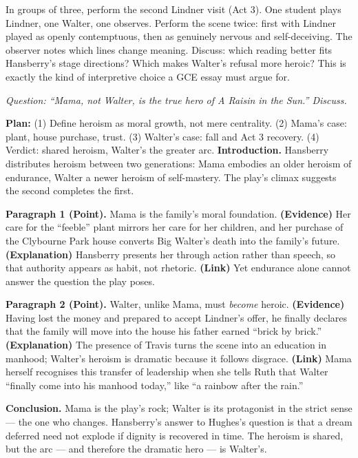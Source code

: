 \documentclass[11pt]{article}
\newcounter{popsec}
\newcounter{popsub}
\newcommand{\courssub}[1]{%
  \stepcounter{popsub}%
  \par\vspace{9pt}\noindent{\popxbold\fontsize{11.5}{13}\selectfont\color{popink}{\color{poporange}\thepopsec.\thepopsub}\hspace{6pt}#1}\par\nopagebreak\vspace{4pt}
}
\begin{document}
\begin{experience}
In groups of three, perform the second Lindner visit (Act 3). One student plays Lindner, one Walter, one observes. Perform the scene twice: first with Lindner played as openly contemptuous, then as genuinely nervous and self-deceiving. The observer notes which lines change meaning. Discuss: which reading better fits Hansberry's stage directions? Which makes Walter's refusal more heroic? This is exactly the kind of interpretive choice a GCE essay must argue for.
\end{experience}

\courssub{Worked Model Answer}

\begin{exoresolu}
\emph{Question: ``Mama, not Walter, is the true hero of A Raisin in the Sun.'' Discuss.}

\textbf{Plan:} (1) Define heroism as moral growth, not mere centrality. (2) Mama's case: plant, house purchase, trust. (3) Walter's case: fall and Act 3 recovery. (4) Verdict: shared heroism, Walter's the greater arc.
\tcblower
\textbf{Introduction.} Hansberry distributes heroism between two generations: Mama embodies an older heroism of endurance, Walter a newer heroism of self-mastery. The play's climax suggests the second completes the first.

\textbf{Paragraph 1 (Point).} Mama is the family's moral foundation. \textbf{(Evidence)} Her care for the ``feeble'' plant mirrors her care for her children, and her purchase of the Clybourne Park house converts Big Walter's death into the family's future. \textbf{(Explanation)} Hansberry presents her through action rather than speech, so that authority appears as habit, not rhetoric. \textbf{(Link)} Yet endurance alone cannot answer the question the play poses.

\textbf{Paragraph 2 (Point).} Walter, unlike Mama, must \emph{become} heroic. \textbf{(Evidence)} Having lost the money and prepared to accept Lindner's offer, he finally declares that the family will move into the house his father earned ``brick by brick.'' \textbf{(Explanation)} The presence of Travis turns the scene into an education in manhood; Walter's heroism is dramatic because it follows disgrace. \textbf{(Link)} Mama herself recognises this transfer of leadership when she tells Ruth that Walter ``finally come into his manhood today,'' like ``a rainbow after the rain.''

\textbf{Conclusion.} Mama is the play's rock; Walter is its protagonist in the strict sense --- the one who changes. Hansberry's answer to Hughes's question is that a dream deferred need not explode if dignity is recovered in time. The heroism is shared, but the arc --- and therefore the dramatic hero --- is Walter's.
\end{exoresolu}
\end{document}
